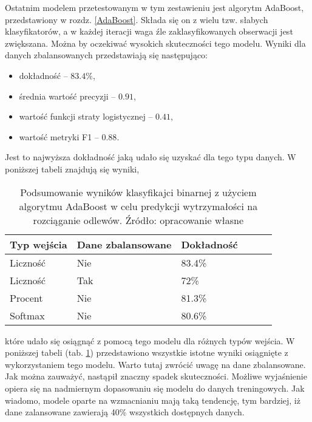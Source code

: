 Ostatnim modelem przetestowanym w tym zestawieniu jest algorytm AdaBoost, przedstawiony w rozdz. \ref{AdaBoost}. Składa się on z wielu tzw. słabych klasyfikatorów, a w każdej iteracji waga źle zaklasyfikowanych obserwacji jest zwiększana. Można by oczekiwać wysokich skuteczności tego modelu. 
Wyniki dla danych zbalansowanych przedstawiają się następująco:
\begin{itemize}
	\item dokładność – $83.4\%$,
	\item średnia wartość precyzji – $0.91$,
	\item wartość funkcji straty logistycznej – $0.41$,
	\item wartość metryki F1 – $0.88$.
\end{itemize}
Jest to najwyższa dokładność jaką udało się uzyskać dla tego typu danych. W poniższej tabeli znajdują się wyniki, 
\begin{table}[!h]
	\centering
	\begin{threeparttable}
		\caption{Podsumowanie wyników klasyfikajci binarnej z użyciem algorytmu AdaBoost w celu predykcji wytrzymałości na rozciąganie odlewów. Źródło: opracowanie własne}
		\label{ada.summary.table}
		\begin{tabularx}{1\textwidth}{ |X|X|X|X|X|X| }
		  \hline
		  \textbf{Typ wejścia} & \textbf{Dane zbalansowane} & \textbf{Dokładność}  \\
		  \hline

	          Liczność & Nie & 83.4\%\\
		  \hline

	          Liczność & Tak & 72\%\\
		  \hline

	          Procent & Nie & 81.3\%\\
		  \hline

	          Softmax & Nie & 80.6\%\\
		  \hline
		\end{tabularx}
	\end{threeparttable}
\end{table}
które udało się osiągnąć z pomocą tego modelu dla różnych typów wejścia. W poniższej tabeli (tab. \ref{ada.summary.table}) przedstawiono wszystkie istotne wyniki osiągnięte z wykorzystaniem tego modelu.
Warto tutaj zwrócić uwagę na dane zbalansowane. Jak można zauważyć, nastąpił znaczny spadek skuteczności. Możliwe wyjaśnienie opiera się na nadmiernym dopasowaniu się modelu do danych treningowych. Jak wiadomo, modele oparte na wzmacnianiu mają taką tendencję, tym bardziej, iż dane zalansowane zawierają 40\% wszystkich dostępnych danych.

